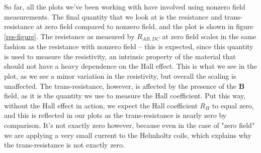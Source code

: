 \documentclass[10pt]{article}
\begin{document}
	So far, all the plots we've been working with have involved using nonzero field measurements. The final
	quantity that we look at is the resistance and trans-resistance at zero field compared to nonzero field, 
	and the plot is shown in figure \ref{res-figure}. The resistance as measured by \( R_{AB, DC} \) at zero
	field scales in the same fashion as the resistance with nonzero field -- this is expected, since this
	quantity is used to measure the resistivity, an intrinsic property of the material that should not have a
	heavy dependence on the Hall effect. This is what we see in the plot, as we see a minor variation in the
	resistivity, but overall the scaling is unaffected.  
	The trans-resistance, however, is affected by the presence of the \( \mathbf{B} \)
	field, as it is the quantity we use to measure the Hall coefficient. Put this way, without the Hall
	effect in action, we expect the Hall coefficient \( R_H \) to equal zero, and this is reflected in our
	plots as the trans-resistance is nearly zero by comparison. It's not exactly zero however, because even
	in the case of "zero field" we are applying a very small current to the Helmholtz coils, which explains
	why the trans-resistance is not exactly zero. 
	 
\end{document}

